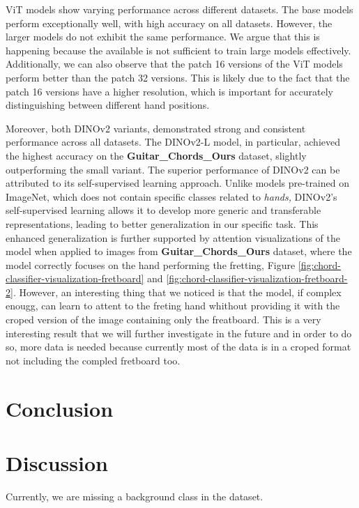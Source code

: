 \documentclass[10pt,twocolumn,letterpaper]{article}
\begin{document}
ViT models show varying performance across different datasets. The base models perform exceptionally well, with high accuracy on all datasets. However, the larger models do not exhibit the same performance. We argue that this is happening because the available is not sufficient to train large models effectively. Additionally, we can also observe that the patch 16 versions of the ViT models perform better than the patch 32 versions. This is likely due to the fact that the patch 16 versions have a higher resolution, which is important for accurately distinguishing between different hand positions.

Moreover, both DINOv2 variants, demonstrated strong and consistent performance across all datasets. The DINOv2-L model, in particular, achieved the highest accuracy on the \textbf{Guitar\_Chords\_Ours} dataset, slightly outperforming the small variant. The superior performance of DINOv2 can be attributed to its self-supervised learning approach. Unlike models pre-trained on ImageNet, which does not contain specific classes related to \emph{hands,} DINOv2's self-supervised learning allows it to develop more generic and transferable representations, leading to better generalization in our specific task. This enhanced generalization is further supported by attention visualizations of the model when applied to images from \textbf{Guitar\_Chords\_Ours} dataset, where the model correctly focuses on the hand performing the fretting, Figure \ref{fig:chord-classifier-visualization-fretboard} and \ref{fig:chord-classifier-visualization-fretboard-2}. However, an interesting thing that we noticed is that the model, if complex enougg, can learn to attent to the freting hand whithout providing it with the croped version of the image containing only the freatboard. This is a very interesting result that we will further investigate in the future and in order to do so, more data is needed because currently most of the data is in a croped format not including the compled fretboard too.

\section{Conclusion}

\section{Discussion}
Currently, we are missing a background class in the dataset.


    {\small
        
        
    }
\end{document}
